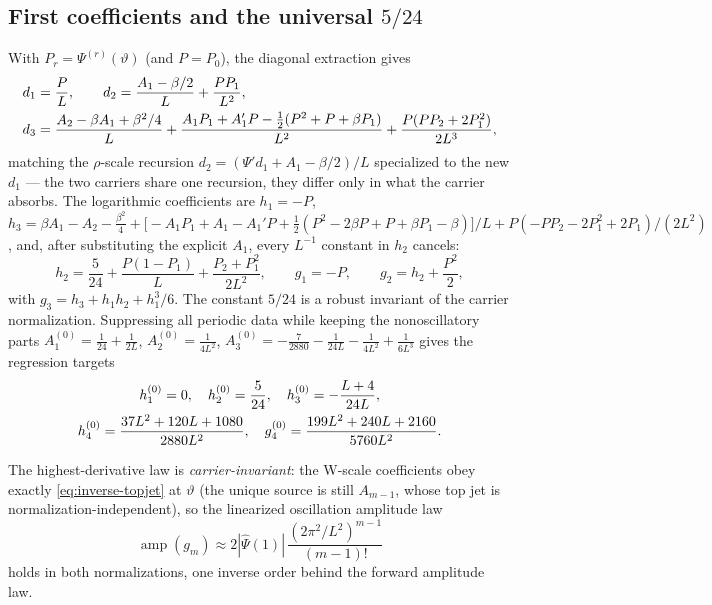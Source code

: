 \documentclass[11pt,oneside]{article}
\numberwithin{equation}{section}
\theoremstyle{definition}
\theoremstyle{remark}
\newcommand{\abs}[1]{\left\lvert #1\right\rvert}
\newcommand{\Psihat}{\widehat\Psi}
\begin{document}
\subsection{First coefficients and the universal $5/24$}

With $P_r=\Psi^{(r)}(\vartheta)$ (and $P=P_0$), the diagonal
extraction gives
\begin{align}
 d_1&=\frac PL,
 \qquad
 d_2=\frac{A_1-\beta/2}{L}+\frac{PP_1}{L^{2}},
 \notag\\
 d_3&=\frac{A_2-\beta A_1+\beta^{2}/4}{L}
 +\frac{A_1P_1+A_1'P-\tfrac12(P^{2}+P+\beta P_1)}{L^{2}}
 +\frac{P(PP_2+2P_1^{2})}{2L^{3}},
 \label{eq:W-d123}
\end{align}
matching the $\rho$-scale recursion
$d_2=(\Psi'd_1+A_1-\beta/2)/L$ specialized to the new
$d_1$ --- the two carriers share one recursion, they differ only in
what the carrier absorbs.  The logarithmic coefficients are
$h_1=-P$,
$h_3=\beta A_1-A_2-\tfrac{\beta^{2}}4
+\bigl[-A_1P_1+A_1-A_1'P
+\tfrac12(P^{2}-2\beta P+P+\beta P_1-\beta)\bigr]/L
+P(-PP_2-2P_1^{2}+2P_1)/(2L^{2})$, and, after substituting the
explicit $A_1$, every $L^{-1}$ constant in $h_2$ cancels:
\begin{equation}
 \boxed{\;
 h_2=\frac5{24}
 +\frac{P(1-P_1)}{L}
 +\frac{P_2+P_1^{2}}{2L^{2}},
 \qquad
 g_1=-P,
 \qquad
 g_2=h_2+\frac{P^{2}}2,
 \;}
 \label{eq:524}
\end{equation}
with $g_3=h_3+h_1h_2+h_1^{3}/6$.  The constant $5/24$ is a robust
invariant of the carrier normalization.  Suppressing all periodic
data while keeping the nonoscillatory parts
$A_1^{(0)}=\tfrac1{24}+\tfrac1{2L}$,
$A_2^{(0)}=\tfrac1{4L^{2}}$,
$A_3^{(0)}=-\tfrac7{2880}-\tfrac1{24L}-\tfrac1{4L^{2}}+\tfrac1{6L^{3}}$
gives the regression targets
\begin{gather}
 h_1^{(0)}=0,\quad
 h_2^{(0)}=\frac5{24},\quad
 h_3^{(0)}=-\frac{L+4}{24L},
 \notag\\
 h_4^{(0)}=\frac{37L^{2}+120L+1080}{2880L^{2}},\quad
 g_4^{(0)}=\frac{199L^{2}+240L+2160}{5760L^{2}}.
 \label{eq:zero-periodic}
\end{gather}

The highest-derivative law is \emph{carrier-invariant}: the W-scale
coefficients obey exactly
\eqref{eq:inverse-topjet} at $\vartheta$ (the unique source is still
$A_{m-1}$, whose top jet is normalization-independent), so the
linearized oscillation amplitude law
\begin{equation}
 \operatorname{amp}(g_m)\approx
 2\abs{\Psihat(1)}\,
 \frac{(2\pi^{2}/L^{2})^{m-1}}{(m-1)!}
 \label{eq:amplitude-law}
\end{equation}
holds in both normalizations, one inverse order behind the forward
amplitude law.
\end{document}
